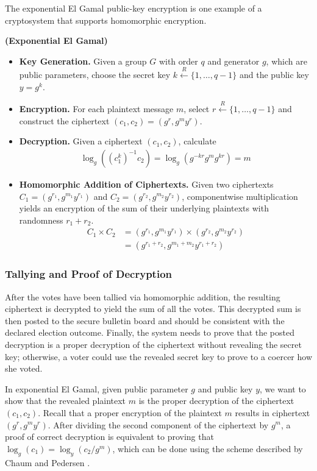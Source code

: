 The exponential El Gamal public-key encryption \cite{elgamal} is one example of a cryptosystem that supports homomorphic encryption.
\begin{definition}
\textbf{(Exponential El Gamal)}
\begin{itemize}
\item \textbf{Key Generation.} Given a group $G$ with order $q$ and generator $g$, which are public parameters, choose the secret key $k \xleftarrow{R} \{1, \dotsc, q-1\}$ and the public key $y = g^k$.
\item \textbf{Encryption.} For each plaintext message $m$, select $r \xleftarrow{R} \{1, \dotsc, q-1\}$ and construct the ciphertext $(c_1, c_2) = (g^r, g^m y^r)$.
\item \textbf{Decryption.} Given a ciphertext $(c_1, c_2)$, calculate
\begin{align*}
\log_g\left((c_1^k)^{-1} c_2\right) = \log_g\left(g^{-kr} g^m g^{kr}\right) = m
\end{align*}
\item \textbf{Homomorphic Addition of Ciphertexts.} Given two ciphertexts $C_1 = (g^{r_1}, g^{m_1} y^{r_1})$ and $C_2 = (g^{r_2}, g^{m_2} y^{r_2})$, componentwise multiplication yields an encryption of the sum of their underlying plaintexts with randomness $r_1 + r_2$.
\begin{align*}
C_1 \times C_2 &= (g^{r_1}, g^{m_1} y^{r_1}) \times (g^{r_2}, g^{m_2} y^{r_2}) \\
&= (g^{r_1 + r_2}, g^{m_1 + m_2} y^{r_1 + r_2})
\end{align*}
\end{itemize}
\end{definition}

\subsubsection{Tallying and Proof of Decryption}

After the votes have been tallied via homomorphic addition, the resulting ciphertext is decrypted to yield the sum of all the votes. This decrypted sum is then posted to the secure bulletin board and should be consistent with the declared election outcome. Finally, the system needs to prove that the posted decryption is a proper decryption of the ciphertext without revealing the secret key; otherwise, a voter could use the revealed secret key to prove to a coercer how she voted.

In exponential El Gamal, given public parameter $g$ and public key $y$, we want to show that the revealed plaintext $m$ is the proper decryption of the ciphertext $(c_1, c_2)$. Recall that a proper encryption of the plaintext $m$ results in ciphertext $(g^r, g^m y^r)$. After dividing the second component of the ciphertext by $g^m$, a proof of correct decryption is equivalent to proving that $\log_{g}(c_1) = \log_{y}(c_2/g^m)$, which can be done using the scheme described by Chaum and Pedersen \cite{chaum-pedersen}.

